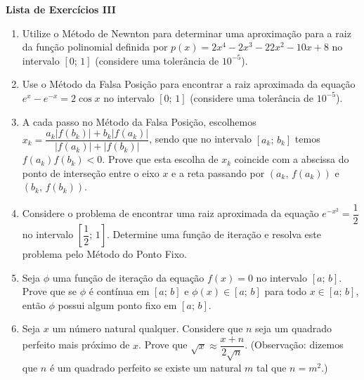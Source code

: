 \documentclass[12pt,a4paper]{article}
\begin{document}
\begin{center}
 \textbf{Lista de Exercícios III}
\end{center}

\begin{enumerate}

 \item Utilize o Método de Newnton para determinar uma aproximação para a raiz da função polinomial definida por $p(x) = 2x^4 -2x^3 -22x^2 - 10x + 8$ no intervalo $[0;\,1]$ (considere uma tolerância 
 de $10^{-5}$).
 \item Use o Método da Falsa Posição para encontrar a raiz aproximada da equação $e^{x} - e^{-x} = 2\cos x$ no intervalo $[0;\,1]$ (considere uma tolerância de $10^{-5}$).

  \item A cada passo no Método da Falsa Posição, escolhemos $x_k = \dfrac{a_k|f(b_k)| + b_k|f(a_k)|}{|f(a_k)|+|f(b_k)|}$, sendo que no intervalo $[a_k;\,b_k]$ temos $f(a_k)f(b_k)<0$. Prove que 
 esta escolha de $x_k$ coincide com a abscissa do ponto de interseção entre o eixo $x$ e a reta passando por $(a_k,\,f(a_k))$ e $(b_k,\,f(b_k))$.
 
 \item Considere o problema de encontrar uma raiz aproximada da equação $e^{-x^2} = \dfrac{1}{2}$ no intervalo $\left[\dfrac{1}{2};\,1\right]$. Determine uma função de iteração e resolva este problema pelo Método do Ponto Fixo.
 \item Seja $\phi$ uma função de iteração da equação $f(x) = 0$ no intervalo $[a;\, b]$. Prove que se $\phi$ é contínua em $[a;\,b]$ e $\phi(x)\in[a;\,b]$ para 
 todo $x\in[a;\, b]$, então $\phi$ possui algum ponto fixo em $[a;\,b]$.
 \item Seja $x$ um número natural qualquer. Considere que $n$ seja um quadrado perfeito mais próximo de $x$. Prove que $\sqrt{x}\approx \dfrac{x+n}{2\sqrt{n}}$. 
 (Observação: dizemos que $n$ é um quadrado perfeito se existe um natural $m$ tal que $n = m^2$.)

\end{enumerate}
\end{document}
